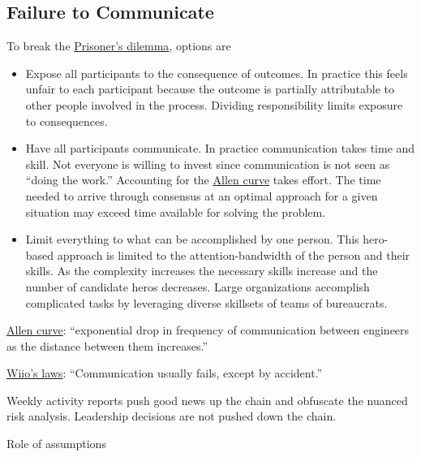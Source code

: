 \subsection{Failure to Communicate\label{sec:failure-to-comm}}

To break the \href{https://en.wikipedia.org/wiki/Prisoner\%27s\_dilemma}{Prisoner's dilemma}, options are 
\begin{itemize}
    \item Expose all participants to the consequence of outcomes. In practice this feels unfair to each participant because the outcome is partially attributable to other people involved in the process. Dividing responsibility limits exposure to consequences.
    \item Have all participants communicate. In practice communication takes time and skill. Not everyone is willing to invest since communication is not seen as ``doing the work.'' Accounting for the \href{https://en.wikipedia.org/wiki/Allen\_curve}{Allen curve} takes effort. The time needed to arrive through consensus at an optimal approach for a given situation may exceed time available for solving the problem.
    \item Limit everything to what can be accomplished by one person. This hero-based approach is limited to the attention-bandwidth of the person and their skills. As the complexity increases the necessary skills increase and the number of candidate heros decreases. Large organizations accomplish complicated tasks by leveraging diverse skillsets of teams of bureaucrats.

\end{itemize}


 
 
\href{https://en.wikipedia.org/wiki/Allen_curve}{Allen curve}: ``exponential drop in frequency of communication between engineers as the distance between them increases.''

\href{https://en.wikipedia.org/wiki/Wiio\%27s_laws}{Wiio's laws}: ``Communication usually fails, except by accident.''


Weekly activity reports push good news up the chain and obfuscate the nuanced risk analysis. 
Leadership decisions are not pushed down the chain.

Role of assumptions 


